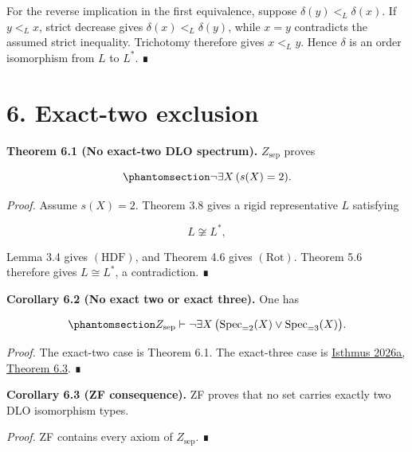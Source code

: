 \documentclass[
  english,
  11pt,
  reqno]{amsart}
\begin{document}
For the reverse implication in the first equivalence, suppose
\(\delta(y)<_L\delta(x)\). If \(y<_Lx\), strict decrease gives
\(\delta(x)<_L\delta(y)\), while \(x=y\) contradicts the assumed strict
inequality. Trichotomy therefore gives \(x<_Ly\). Hence \(\delta\) is an
order isomorphism from \(L\) to \(L^*\). ∎

\protect{}\label{sec:main-theorem}

\section{6. Exact-two exclusion}\label{exact-two-exclusion}

\protect{}\label{thm:6-1-main}

\textbf{Theorem 6.1 (No exact-two DLO spectrum).} \(Z_{\mathrm{sep}}\)
proves

\begin{equation}\protect\phantomsection\label{eq:main-theorem}{
\neg\exists X\,(s(X)=2).
}\end{equation}

\emph{Proof.} Assume \(s(X)=2\). Theorem 3.8 gives a rigid
representative \(L\) satisfying

\[
L\not\cong L^*,
\]

Lemma 3.4 gives \((\mathrm{HDF})\), and Theorem 4.6 gives
\((\mathrm{Rot})\). Theorem 5.6 therefore gives \(L\cong L^*\), a
contradiction. ∎

\protect{}\label{cor:6-2-two-three-gap}

\textbf{Corollary 6.2 (No exact two or exact three).} One has

\begin{equation}\protect\phantomsection\label{eq:two-three-gap}{
Z_{\mathrm{sep}}
\vdash
\neg\exists X\,
\bigl(
\operatorname{Spec}_{=2}(X)
\vee
\operatorname{Spec}_{=3}(X)
\bigr).
}\end{equation}

\emph{Proof.} The exact-two case is Theorem 6.1. The exact-three case is
\hyperref[ref:isthmus2026a]{Isthmus 2026a, Theorem 6.3}. ∎

\protect{}\label{cor:6-3-zf}

\textbf{Corollary 6.3 (ZF consequence).} ZF proves that no set carries
exactly two DLO isomorphism types.

\emph{Proof.} ZF contains every axiom of \(Z_{\mathrm{sep}}\). ∎

\protect{}\label{sec:scope}
\end{document}
